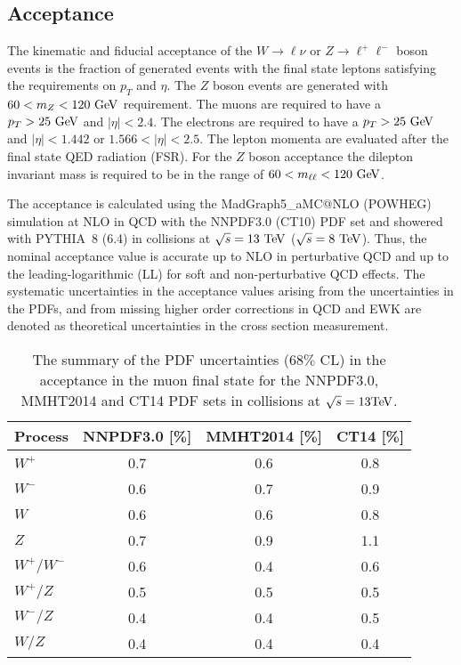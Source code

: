 \subsection{Acceptance}

The kinematic and fiducial acceptance of the $W \rightarrow{\ell\nu}$ or $Z\rightarrow\ell^{+}\ell^{-}$ boson events is the fraction of generated events with the final state leptons satisfying the requirements on $p_{T}$ and $\eta$. The $Z$ boson events are generated with $60<m_{Z}<120~\mathrm{Ge\kern -0.1em V}$ requirement. The muons are required to have a $p_{T}>25~\mathrm{Ge\kern -0.1em V}$ and $|\eta|<2.4$. The electrons are required to have a $p_{T}>25~\mathrm{Ge\kern -0.1em V}$ and $|\eta|<1.442$ or $1.566<|\eta|<2.5$. The lepton momenta are evaluated after the final state QED radiation (FSR). For the $Z$ boson acceptance the dilepton invariant mass is required to be in the range of $60<m_{\ell\ell}<120~\mathrm{Ge\kern -0.1em V}$.

The acceptance is calculated using the MadGraph5\_aMC@NLO (POWHEG) simulation at NLO in QCD with the NNPDF3.0 (CT10) PDF set and showered with PYTHIA~8 (6.4) in collisions at $\sqrt{s}=13~\mathrm{Te\kern -0.1em V}$ ($\sqrt{s}=8~\mathrm{Te\kern -0.1em V}$). Thus, the nominal acceptance value is accurate up to NLO in perturbative QCD and up to the leading-logarithmic (LL) for soft and non-perturbative QCD effects. The systematic uncertainties in the acceptance values arising from the uncertainties in the PDFs, and from missing higher order corrections in QCD and EWK are denoted as theoretical uncertainties in the cross section measurement. 
\begin{table}
\begin{center}
\begin{tabular}{|l|c|c|c|}
\hline
Process  &  NNPDF3.0 [\%]  &  MMHT2014 [\%]  &  CT14 [\%] \\
\hline
\hline
$W^+$        & 0.7          &  0.6           &  0.8 \\
$W^-$  & 0.6          &  0.7           &  0.9 \\
$W$            & 0.6          &  0.6           &  0.8 \\
$Z$            & 0.7          &  0.9           &  1.1 \\
$W^+/W^-$                        & 0.6          &  0.4           &  0.6 \\
$W^+/Z$                           & 0.5          &  0.5           &  0.5 \\
$W^-/Z$                           & 0.4          &  0.4           &  0.5 \\
$W/Z$                            & 0.4          &  0.4           &  0.4 \\
\hline
\hline
\end{tabular}
\caption{The summary of the PDF uncertainties ($68\%$ CL) in the acceptance in the muon final state for the NNPDF3.0, MMHT2014 and CT14 PDF sets in collisions at $\sqrt{s}=13\mathrm{Te\kern -0.1em V}$.}
\label{tab:pdf_mu}
\end{center}
\end{table}

